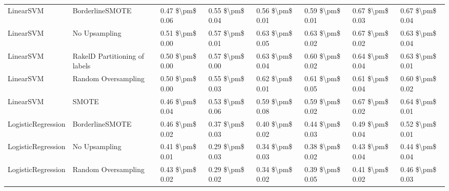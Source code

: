 \begin{tabular}{llllllll}
                      LinearSVM &               BorderlineSMOTE & 0.47 \$\textbackslash pm\$ 0.06 &           0.55 \$\textbackslash pm\$ 0.04 &       0.56 \$\textbackslash pm\$ 0.01 &        0.59 \$\textbackslash pm\$ 0.01 &                         0.67 \$\textbackslash pm\$ 0.03 & 0.67 \$\textbackslash pm\$ 0.04 \\
                      LinearSVM &                 No Upsampling & 0.51 \$\textbackslash pm\$ 0.00 &           0.57 \$\textbackslash pm\$ 0.01 &       0.63 \$\textbackslash pm\$ 0.05 &        0.63 \$\textbackslash pm\$ 0.02 &                         0.67 \$\textbackslash pm\$ 0.02 & 0.63 \$\textbackslash pm\$ 0.04 \\
                      LinearSVM & RakelD Partitioning of labels & 0.50 \$\textbackslash pm\$ 0.00 &           0.57 \$\textbackslash pm\$ 0.00 &       0.63 \$\textbackslash pm\$ 0.04 &        0.60 \$\textbackslash pm\$ 0.02 &                         0.64 \$\textbackslash pm\$ 0.04 & 0.63 \$\textbackslash pm\$ 0.01 \\
                      LinearSVM &           Random Oversampling & 0.50 \$\textbackslash pm\$ 0.00 &           0.55 \$\textbackslash pm\$ 0.03 &       0.62 \$\textbackslash pm\$ 0.01 &        0.61 \$\textbackslash pm\$ 0.05 &                         0.61 \$\textbackslash pm\$ 0.04 & 0.60 \$\textbackslash pm\$ 0.02 \\
                      LinearSVM &                         SMOTE & 0.46 \$\textbackslash pm\$ 0.04 &           0.53 \$\textbackslash pm\$ 0.06 &       0.59 \$\textbackslash pm\$ 0.08 &        0.59 \$\textbackslash pm\$ 0.02 &                         0.67 \$\textbackslash pm\$ 0.02 & 0.64 \$\textbackslash pm\$ 0.01 \\
             LogisticRegression &               BorderlineSMOTE & 0.46 \$\textbackslash pm\$ 0.02 &           0.37 \$\textbackslash pm\$ 0.03 &       0.40 \$\textbackslash pm\$ 0.02 &        0.44 \$\textbackslash pm\$ 0.03 &                         0.49 \$\textbackslash pm\$ 0.04 & 0.52 \$\textbackslash pm\$ 0.01 \\
             LogisticRegression &                 No Upsampling & 0.41 \$\textbackslash pm\$ 0.01 &           0.29 \$\textbackslash pm\$ 0.03 &       0.34 \$\textbackslash pm\$ 0.03 &        0.38 \$\textbackslash pm\$ 0.02 &                         0.43 \$\textbackslash pm\$ 0.04 & 0.44 \$\textbackslash pm\$ 0.04 \\
             LogisticRegression &           Random Oversampling & 0.43 \$\textbackslash pm\$ 0.02 &           0.29 \$\textbackslash pm\$ 0.02 &       0.34 \$\textbackslash pm\$ 0.02 &        0.39 \$\textbackslash pm\$ 0.05 &                         0.41 \$\textbackslash pm\$ 0.02 & 0.46 \$\textbackslash pm\$ 0.03 \\

\end{tabular}
